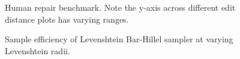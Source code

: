 \documentclass[11pt]{article}
\begin{document}
  \begin{figure}
    \resizebox{.24\textwidth}{!}{}
    \resizebox{.24\textwidth}{!}{}
    \resizebox{.24\textwidth}{!}{}
    \resizebox{.24\textwidth}{!}{}
    \caption{Human repair benchmark. Note the y-axis across different edit distance plots has varying ranges.}\label{fig:human}
  \end{figure}

  \begin{figure}
    
    \caption{Sample efficiency of Levenshtein Bar-Hillel sampler at varying Levenshtein radii.}\label{fig:sample_efficiency}
  \end{figure}
\end{document}
